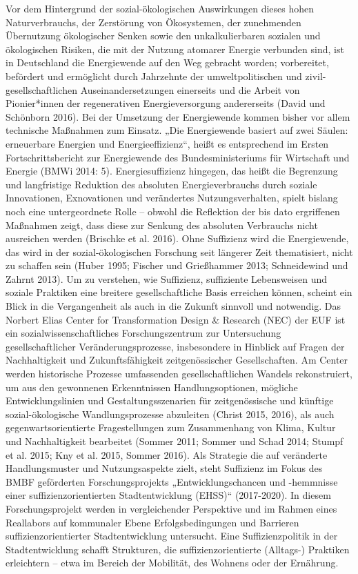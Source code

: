 \documentclass[a4paper,11pt,twoside]{scrartcl}
\begin{document}
Vor dem Hintergrund der sozial-ökologischen Auswirkungen dieses hohen Naturverbrauchs, der Zerstörung von Ökosystemen, der zunehmenden Übernutzung ökologischer Senken sowie den unkalkulierbaren sozialen und ökologischen Risiken, die mit der Nutzung atomarer Energie verbunden sind, ist in Deutschland die Energiewende auf den Weg gebracht worden; vorbereitet, befördert und ermöglicht durch Jahrzehnte der umweltpolitischen und zivil-gesellschaftlichen Auseinandersetzungen einerseits und die Arbeit von Pionier*innen der regenerativen Energieversorgung andererseits (David und Schönborn 2016). Bei der Umsetzung der Energiewende kommen bisher vor allem technische Maßnahmen zum Einsatz. „Die Energiewende basiert auf zwei Säulen: erneuerbare Energien und Energieeffizienz“, heißt es entsprechend im Ersten Fortschrittsbericht zur Energiewende des Bundesministeriums für Wirtschaft und Energie (BMWi 2014: 5). Energiesuffizienz hingegen, das heißt die Begrenzung und langfristige Reduktion des absoluten Energieverbrauchs durch soziale Innovationen, Exnovationen und verändertes Nutzungsverhalten, spielt bislang noch eine untergeordnete Rolle – obwohl die Reflektion der bis dato ergriffenen Maßnahmen zeigt, dass diese zur Senkung des absoluten Verbrauchs nicht ausreichen werden (Brischke et al. 2016). Ohne Suffizienz wird die Energiewende, das wird in der sozial-ökologischen Forschung seit längerer Zeit thematisiert, nicht zu schaffen sein (Huber 1995; Fischer und Grießhammer 2013; Schneidewind und Zahrnt 2013). Um zu verstehen, wie Suffizienz, suffiziente Lebensweisen und soziale Praktiken eine breitere gesellschaftliche Basis erreichen können, scheint ein Blick in die Vergangenheit als auch in die Zukunft sinnvoll und notwendig.
Das Norbert Elias Center for Transformation Design & Research (NEC) der EUF ist ein sozialwissenschaftliches Forschungszentrum zur Untersuchung gesellschaftlicher Veränderungsprozesse, insbesondere in Hinblick auf Fragen der Nachhaltigkeit und Zukunftsfähigkeit zeitgenössischer Gesellschaften. Am Center werden historische Prozesse umfassenden gesellschaftlichen Wandels rekonstruiert, um aus den gewonnenen Erkenntnissen Handlungsoptionen, mögliche Entwicklungslinien und Gestaltungsszenarien für zeitgenössische und künftige sozial-ökologische Wandlungsprozesse abzuleiten (Christ 2015, 2016), als auch gegenwartsorientierte Fragestellungen zum Zusammenhang von Klima, Kultur und Nachhaltigkeit bearbeitet (Sommer 2011; Sommer und Schad 2014; Stumpf et al. 2015; Kny et al. 2015, Sommer 2016).
Als Strategie die auf veränderte Handlungsmuster und Nutzungsaspekte zielt, steht Suffizienz im Fokus des BMBF geförderten Forschungsprojekts „Entwicklungschancen und -hemmnisse einer suffizienzorientierten Stadtentwicklung (EHSS)“ (2017-2020). In diesem Forschungsprojekt werden in vergleichender Perspektive und im Rahmen eines Reallabors auf kommunaler Ebene Erfolgsbedingungen und Barrieren suffizienzorientierter Stadtentwicklung untersucht. Eine Suffizienzpolitik in der Stadtentwicklung schafft Strukturen, die suffizienzorientierte (Alltags-) Praktiken erleichtern – etwa im Bereich der Mobilität, des Wohnens oder der Ernährung.
\end{document}

